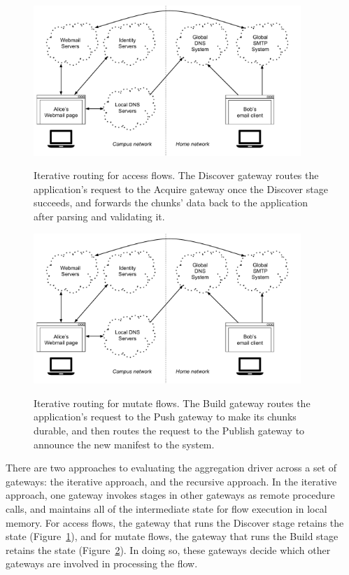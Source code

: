 \begin{figure}[h!]
   \caption{Iterative routing for access flows.  The Discover gateway routes the
   application's request to the Acquire gateway once the Discover stage
   succeeds, and forwards the chunks' data back to the application after parsing
   and validating it.}
   \centering
   \includegraphics[width=0.9\textwidth,page=9]{figures/dissertation-figures}
   \label{fig:chap2-access-flow-protocol}
\end{figure}

\begin{figure}[h!]
   \caption{Iterative routing for mutate flows.  The Build gateway routes the
   application's request to the Push gateway to make its chunks durable, and
   then routes the request to the Publish gateway to announce the new manifest
   to the system.}
   \centering
   \includegraphics[width=0.9\textwidth,page=10]{figures/dissertation-figures}
   \label{fig:chap2-mutate-flow-protocol}
\end{figure}

There are two approaches to evaluating the aggregation driver across a set of
gateways:  the iterative approach, and the recursive approach.
In the iterative approach, one gateway invokes stages in other gateways as
remote procedure calls, and maintains all of the intermediate state for flow
execution in local memory.  For access flows, the gateway that runs the Discover
stage retains the state (Figure~\ref{fig:chap2-access-flow-protocol}), and for
mutate flows, the gateway that runs the Build stage retains the state
(Figure~\ref{fig:chap2-mutate-flow-protocol}).  In doing so, these gateways
decide which other gateways are involved in processing the flow.

